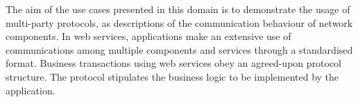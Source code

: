 

 



The aim of the use cases presented in this domain is to
demonstrate the usage of multi-party protocols, as descriptions of
the communication behaviour of network components.
In web services, applications make an extensive use
of communications among multiple components and services
through a standardised format.
Business transactions using web services
obey an agreed-upon protocol structure.
The protocol stipulates the business logic to
be implemented by the application.


